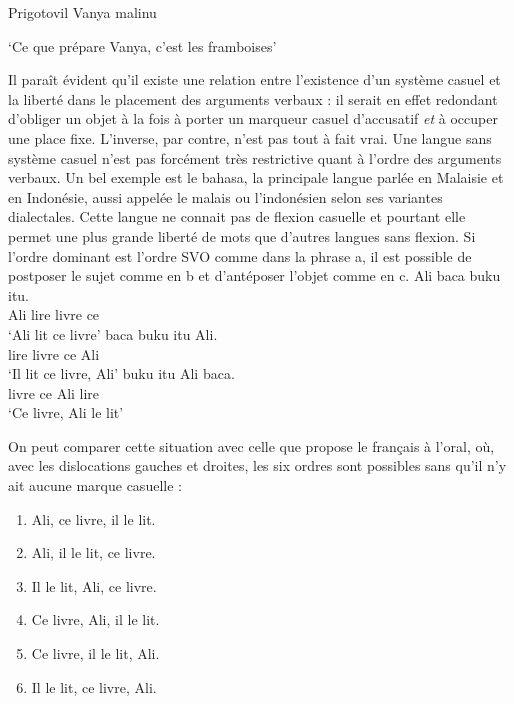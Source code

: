 {        {Prigotovil}   {Vanya}   {malinu}

    ‘Ce que prépare  Vanya,  c’est les framboises’
    \z

    Il paraît évident qu’il existe une relation entre l’existence d’un système casuel et la liberté dans le placement des arguments verbaux : il serait en effet redondant d’obliger un objet à la fois à porter un marqueur casuel d’accusatif \textit{et} à occuper une place fixe. L’inverse, par contre, n’est pas tout à fait vrai. Une langue sans système casuel n’est pas forcément très restrictive quant à l’ordre des arguments verbaux. Un bel exemple est le bahasa, la principale langue parlée en Malaisie et en Indonésie, aussi appelée le malais ou l’indonésien selon ses variantes dialectales. Cette langue ne connait pas de flexion casuelle et pourtant elle permet une plus grande liberté de mots que d’autres langues sans flexion. Si l’ordre dominant est l’ordre SVO comme dans la phrase a, il est possible de postposer le sujet comme en b et d’antéposer l’objet comme en c.
    \ea
    \ea
    \gll Ali baca buku itu.\\
    Ali lire    livre  ce\\
    \glt  ‘Ali lit ce livre’
    \ex
    \gll baca buku itu Ali.\\
    lire    livre  ce Ali\\
    \glt  ‘Il lit ce livre, Ali’
    \ex
    \gll buku itu Ali baca.\\
        livre ce Ali lire    \\
    \glt  ‘Ce livre, Ali le lit’
    \z
    \z

    On peut comparer cette situation avec celle que propose le français à l’oral, où, avec les dislocations gauches et droites, les six ordres sont possibles sans qu’il n’y ait aucune marque casuelle :

    \begin{enumerate}
    \item {Ali, ce livre, il le lit.}
    \item {Ali, il le lit, ce livre.}
    \item {Il le lit, Ali, ce livre.}
    \item {Ce livre, Ali, il le lit.}
    \item {Ce livre, il le lit, Ali.}
    \item {Il le lit, ce livre, Ali.}
    \end{enumerate}
}
